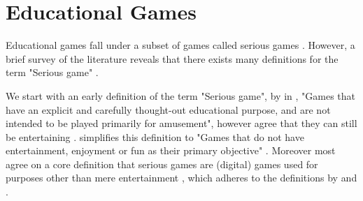 \documentclass[a4paper,11.5pt]{report}
\numberwithin{figure}{section}
\numberwithin{table}{section}
\numberwithin{equation}{section}
\numberwithin{equation}{section}
\begin{document}





\section{Educational Games}

Educational games fall under a subset of games called serious games \cite{Michael2005, Zyda2005}. However, a brief survey of the literature reveals that there exists many definitions for the term "Serious game" \cite{Johann2015}. 

We start with an early definition of the term "Serious game", by \citeauthor{apt1970} in \citeyear{apt1970}, "Games that have an explicit and carefully thought-out educational purpose, and are not intended to be played primarily for amusement", however agree that they can still be entertaining \cite{apt1970}. \citeauthor{Michael2005} simplifies this definition to "Games that do not have entertainment, enjoyment or fun as their primary objective" \cite{Michael2005}. Moreover most agree on a core definition that serious games are (digital) games used for purposes other than mere entertainment \cite{Johann2015}, which adheres to the definitions by \citeauthor{apt1970} and \citeauthor{Michael2005}.
\end{document}
